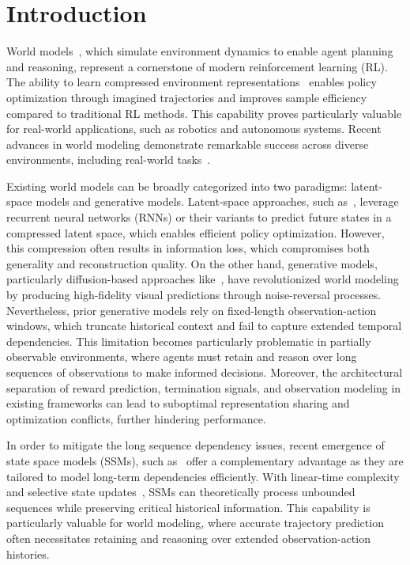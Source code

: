 \section{Introduction}
\vspace{-0.5em}
World models~\cite{NEURIPS2018_2de5d166}, which simulate environment dynamics to enable agent planning and reasoning, represent a cornerstone of modern reinforcement learning (RL). The ability to learn compressed environment representations~\cite{hafner2024DreamerV3, Schrittwieser_2020} enables policy optimization through imagined trajectories and improves sample efficiency~\cite{NEURIPS2021_d5eca8dc} compared to traditional RL methods. This capability proves particularly valuable for real-world applications, such as robotics and autonomous systems. Recent advances in world modeling demonstrate remarkable success across diverse environments, including real-world tasks~\cite{wu2022daydreamer}.

Existing world models can be broadly categorized into two paradigms: latent-space models and generative models. Latent-space approaches, such as~\cite{Hafner2020Dreamer, hafner2021DreamerV2, hafner2024DreamerV3}, leverage recurrent neural networks (RNNs) or their variants to predict future states in a compressed latent space, which enables efficient policy optimization. However, this compression often results in information loss, which compromises both generality and reconstruction quality. On the other hand, generative models, particularly diffusion-based approaches like~\cite{alonso2024diamond}, have revolutionized world modeling by producing high-fidelity visual predictions through noise-reversal processes. Nevertheless, prior generative models rely on fixed-length observation-action windows, which truncate historical context and fail to capture extended temporal dependencies. This limitation becomes particularly problematic in partially observable environments, where agents must retain and reason over long sequences of observations to make informed decisions. Moreover, the architectural separation of reward prediction, termination signals, and observation modeling in existing frameworks can lead to suboptimal representation sharing and optimization conflicts, further hindering performance.

In order to mitigate the long sequence dependency issues, recent emergence of state space models (SSMs), such as~\cite{gu2022efficiently, gu2022parameterizationinitializationdiagonalstate, smith2023simplified, gu2024mamba, dao2024transformersssmsgeneralizedmodels} offer a complementary advantage as they are tailored to model long-term dependencies efficiently. With linear-time complexity and selective state updates~\cite{gu2024mamba}, SSMs can theoretically process unbounded sequences while preserving critical historical information. This capability is particularly valuable for world modeling, where accurate trajectory prediction often necessitates retaining and reasoning over extended observation-action histories.

